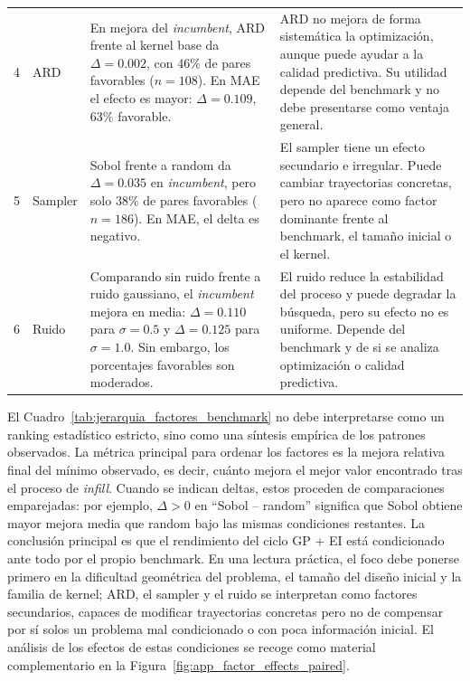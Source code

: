 \begin{table}[h]
\begin{tabularx}{\textwidth}{@{}p{0.8cm}p{2.7cm}XX@{}}
  4
  & ARD
  & En mejora del \emph{incumbent}, ARD frente al kernel base da \(\Delta=0.002\), con \(46\%\) de pares favorables (\(n=108\)). En MAE el efecto es mayor:
  \(\Delta=0.109\), \(63\%\) favorable.
  & ARD no mejora de forma sistemática la optimización, aunque puede ayudar a la calidad predictiva. Su utilidad depende del benchmark y no debe presentarse como
  ventaja general. \\

  5
  & Sampler
  & Sobol frente a random da \(\Delta=0.035\) en \emph{incumbent}, pero solo \(38\%\) de pares favorables (\(n=186\)). En MAE, el delta es negativo.
  & El sampler tiene un efecto secundario e irregular. Puede cambiar trayectorias concretas, pero no aparece como factor dominante frente al benchmark, el tamaño
  inicial o el kernel. \\

  6
  & Ruido
  & Comparando sin ruido frente a ruido gaussiano, el \emph{incumbent} mejora en media: \(\Delta=0.110\) para \(\sigma=0.5\) y \(\Delta=0.125\) para \(\sigma=1.0\).
  Sin embargo, los porcentajes favorables son moderados.
  & El ruido reduce la estabilidad del proceso y puede degradar la búsqueda, pero su efecto no es uniforme. Depende del benchmark y de si se analiza optimización o
  calidad predictiva. \\

  \bottomrule
  \end{tabularx}
  \end{table}
\FloatBarrier


El Cuadro~\ref{tab:jerarquia_factores_benchmark} no debe interpretarse como un ranking estadístico estricto, sino como una síntesis empírica de los patrones
observados. La métrica principal para ordenar los factores es la mejora relativa final del mínimo observado, es decir, cuánto mejora el mejor valor encontrado tras
el proceso de \emph{infill}. Cuando se indican deltas, estos proceden de comparaciones emparejadas: por ejemplo, \(\Delta>0\) en ``Sobol -- random'' significa que
Sobol obtiene mayor mejora media que random bajo las mismas condiciones restantes.
La conclusión principal es que el rendimiento del ciclo GP + EI está condicionado ante todo por el propio benchmark. En una lectura práctica, el foco debe ponerse primero en la dificultad geométrica del problema, el tamaño del diseño inicial y la familia de kernel; ARD, el sampler y el ruido se interpretan como factores secundarios, capaces de modificar trayectorias concretas pero no de compensar por sí solos un problema mal condicionado o con poca información inicial. El análisis de los efectos de estas condiciones se recoge como material complementario en la Figura~\ref{fig:app_factor_effects_paired}.

